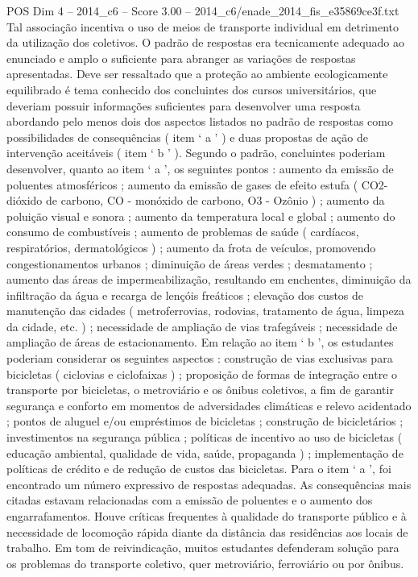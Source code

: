 \begin{textsample}{POS Dim 4 – 2014\_c6 – Score 3.00 – 2014\_c6/enade\_2014\_fis\_e35869ce3f.txt}
Tal associação incentiva o uso de meios de transporte individual em detrimento da utilização dos coletivos.
O padrão de respostas era tecnicamente adequado ao enunciado e amplo o suficiente para abranger as variações de respostas apresentadas.
Deve ser ressaltado que a proteção ao ambiente ecologicamente equilibrado é tema conhecido dos concluintes dos cursos universitários, que deveriam possuir informações suficientes para desenvolver uma resposta abordando pelo menos dois dos aspectos listados no padrão de respostas como possibilidades de consequências ( item ‘ a ’ ) e duas propostas de ação de intervenção aceitáveis ( item ‘ b ’ ).
Segundo o padrão, concluintes poderiam desenvolver, quanto ao item ‘ a ’, os seguintes pontos : aumento da emissão de poluentes atmosféricos ; aumento da emissão de gases de efeito estufa ( CO2- dióxido de carbono, CO - monóxido de carbono, O3 - Ozônio ) ; aumento da poluição visual e sonora ; aumento da temperatura local e global ; aumento do consumo de combustíveis ; aumento de problemas de saúde ( cardíacos, respiratórios, dermatológicos ) ; aumento da frota de veículos, promovendo congestionamentos urbanos ; diminuição de áreas verdes ; desmatamento ; aumento das áreas de impermeabilização, resultando em enchentes, diminuição da infiltração da água e recarga de lençóis freáticos ; elevação dos custos de manutenção das cidades ( metroferrovias, rodovias, tratamento de água, limpeza da cidade, etc. ) ; necessidade de ampliação de vias trafegáveis ; necessidade de ampliação de áreas de estacionamento.
Em relação ao item ‘ b ’, os estudantes poderiam considerar os seguintes aspectos : construção de vias exclusivas para bicicletas ( ciclovias e ciclofaixas ) ; proposição de formas de integração entre o transporte por bicicletas, o metroviário e os ônibus coletivos, a fim de garantir segurança e conforto em momentos de adversidades climáticas e relevo acidentado ; pontos de aluguel e/ou empréstimos de bicicletas ; construção de bicicletários ; investimentos na segurança pública ; políticas de incentivo ao uso de bicicletas ( educação ambiental, qualidade de vida, saúde, propaganda ) ; implementação de políticas de crédito e de redução de custos das bicicletas.
Para o item ‘ a ’, foi encontrado um número expressivo de respostas adequadas.
As consequências mais citadas estavam relacionadas com a emissão de poluentes e o aumento dos engarrafamentos.
Houve críticas frequentes à qualidade do transporte público e à necessidade de locomoção rápida diante da distância das residências aos locais de trabalho.
Em tom de reivindicação, muitos estudantes defenderam solução para os problemas do transporte coletivo, quer metroviário, ferroviário ou por ônibus.

\end{textsample}
